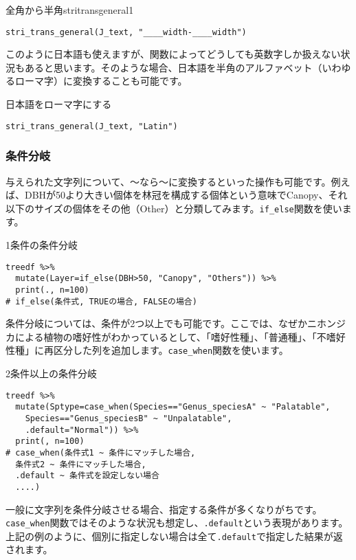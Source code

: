 \begin{exercise}{全角から半角}{stritransgeneral1}
\begin{verbatim}
stri_trans_general(J_text, "____width-____width")
\end{verbatim}
\end{exercise}

このように日本語も使えますが、関数によってどうしても英数字しか扱えない状況もあると思います。そのような場合、日本語を半角のアルファベット（いわゆるローマ字）に変換することも可能です。
\begin{itembox}[l]{日本語をローマ字にする}
\begin{verbatim}
stri_trans_general(J_text, "Latin")
\end{verbatim}
\end{itembox}

    \subsubsection{条件分岐}
与えられた文字列について、〜なら〜に変換するといった操作も可能です。例えば、DBHが50より大きい個体を林冠を構成する個体という意味でCanopy、それ以下のサイズの個体をその他（Other）と分類してみます。\verb|if_else|関数を使います。
\begin{itembox}[l]{1条件の条件分岐}
\begin{verbatim}
treedf %>%
  mutate(Layer=if_else(DBH>50, "Canopy", "Others")) %>%
  print(., n=100)
# if_else(条件式, TRUEの場合, FALSEの場合)
\end{verbatim}
\end{itembox}

条件分岐については、条件が2つ以上でも可能です。ここでは、なぜかニホンジカによる植物の嗜好性がわかっているとして、「嗜好性種」、「普通種」、「不嗜好性種」に再区分した列を追加します。\verb|case_when|関数を使います。
\begin{itembox}[l]{2条件以上の条件分岐}
\begin{verbatim}
treedf %>%
  mutate(Sptype=case_when(Species=="Genus_speciesA" ~ "Palatable",
    Species=="Genus_speciesB" ~ "Unpalatable",
    .default="Normal")) %>%
  print(, n=100)
# case_when(条件式1 ~ 条件にマッチした場合,
  条件式2 ~ 条件にマッチした場合,
  .default ~ 条件式を設定しない場合
  ....)
\end{verbatim}
\end{itembox}
一般に文字列を条件分岐させる場合、指定する条件が多くなりがちです。\verb|case_when|関数ではそのような状況も想定し、\verb|.default|という表現があります。上記の例のように、個別に指定しない場合は全て\verb|.default|で指定した結果が返されます。

